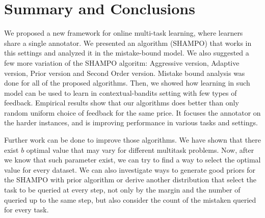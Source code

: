 \chapter{Summary and Conclusions}
We proposed a new framework for online multi-task learning, where  learners share a single annotator. 
We presented an algorithm (SHAMPO) that works in this settings and analyzed it in the mistake-bound 
model. We also suggested a few more variation of the SHAMPO algoritm: Aggressive 
version, Adaptive version, Prior version and Second Order version. Mistake bound analysis was done for all
of the proposed algorithms. 
Then, we showed how learning in such model can be used to learn in contextual-bandits setting 
with few types of feedback. Empirical results show that our algorithms does better than only random uniform
choice of feedback for the same price. 
It focuses the annotator on the harder instances, and is improving performance in various tasks and settings. 

Further work can be done  to improve those algorithms. We have shown that there exist $b$ optimal value 
that may vary for different multitask problems.  
Now, after we know that such parameter exist, we can try to find a way to select the optimal value for every dataset.  
We can also investigate ways to generate good priors for the SHAMPO with prior algorithm or derive another 
distribution that select the task to be queried at every step, not only by the margin and the number of queried 
up to the same step, but also consider the count of the mistaken queried for every task.

